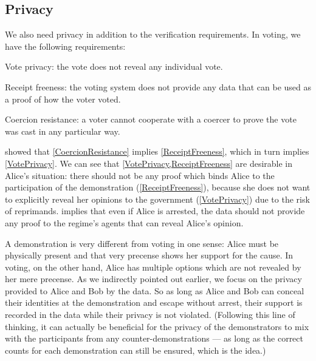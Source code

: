 \subsection{Privacy}
\label{Privacy}

We also need privacy in addition to the verification requirements.
In voting, we have the following requirements:
\begin{frame}
\begin{requirements}[P]
\item\label{VotePrivacy} Vote privacy: the vote does not reveal any individual 
  vote.
\item\label{ReceiptFreeness} Receipt freeness: the voting system does not 
  provide any data that can be used as a proof of how the voter voted.
\item\label{CoercionResistance} Coercion resistance: a voter cannot cooperate 
  with a coercer to prove the vote was cast in any particular way.
\end{requirements}
\end{frame}
\Textcite{VerifyingPrivacyPropertiesOfVotingProtocols} showed that 
\cref{CoercionResistance} implies \cref{ReceiptFreeness}, which in turn implies
\cref{VotePrivacy}.
We can see that \cref{VotePrivacy,ReceiptFreeness} are desirable in Alice's 
situation: there should not be any proof which binds Alice to the participation 
of the demonstration (\cref{ReceiptFreeness}), because she does not want to 
explicitly reveal her opinions to the government (\cref{VotePrivacy}) due to 
the risk of reprimands.
 implies that even if Alice is arrested, the data should 
not provide any proof to the regime's agents that can reveal Alice's opinion.

A demonstration is very different from voting in one sense: Alice must be 
physically present and that very precense shows her support for the cause.
In voting, on the other hand, Alice has multiple options which are not revealed
by her mere precense.
As we indirectly pointed out earlier, we focus on the privacy provided to Alice 
and Bob by the data.
So as long as Alice and Bob can conceal their identities at the demonstration 
and escape without arrest, their support is recorded in the data while their 
privacy is not violated.
(Following this line of thinking, it can actually be beneficial for the privacy of 
the demonstrators to mix with the participants from any counter-demonstrations 
--- as long as the correct counts for each demonstration can still be ensured, 
which is the idea.)

